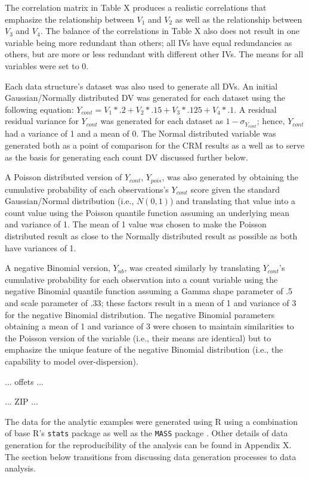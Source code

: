 \documentclass[ShortAfour,times,sageapa]{sagej}
\begin{document}
	\smallskip
	
	The correlation matrix in Table X produces a realistic correlations that emphasize the relationship between $V_1$ and $V_2$ as well as the relationship between $V_3$ and $V_4$.  
	The balance of the correlations in Table X also does not result in one variable being more redundant than others; all IVs have equal redundancies as others, but are more or less redundant with different other IVs.	The means for all variables were set to 0.
	
	Each data structure's dataset was also used to generate all DVs.  An initial Gaussian/Normally distributed DV was generated for each dataset using the following equation: $Y_{cont} = V_1*.2 + V_2*.15 + V_3*.125 + V_4*.1$.  A residual residual variance for $Y_{cont}$ was generated for each dataset as $1 - \sigma_{Y_{cont}}$; hence, $Y_{cont}$ had a variance of 1 and a mean of 0.  
	The Normal distributed variable was generated both as a point of comparison for the CRM results as a well as to serve as the basis for generating each count DV discussed further below.
	
	A Poisson distributed version of $Y_{cont}$, $Y_{pois}$, was also generated by obtaining the cumulative probability of each observations's $Y_{cont}$ score given the standard Gaussian/Normal distribution (i.e., $N(0,1)$) and translating that value into a count value using the Poisson quantile function assuming an underlying mean and variance of 1.  
	The mean of 1 value was chosen to make the Poisson distributed result as close to the Normally distributed result as possible as both have variances of 1.	
	
	A negative Binomial version, $Y_{nb}$, was created similarly by translating $Y_{cont}$'s cumulative probability for each observation into a count variable using the negative Binomial quantile function assuming a Gamma shape parameter of .5 and scale parameter of .33; these factors result in a mean of 1 and variance of 3 for the negative Binomial distribution.  
	The negative Binomial parameters obtaining a mean of 1 and variance of 3 were chosen to maintain similarities to the Poisson version of the variable (i.e., their means are identical) but to emphasize the unique feature of the negative Binomial distribution (i.e., the capability to model over-dispersion).  
	
	... offets ...
	
	... ZIP ...
	
	The data for the analytic examples were generated using R \cite{R} using a combination of base R's \texttt{stats} package as well as the \texttt{MASS} package \cite{MASS}.  
	Other details of data generation for the reproducibility of the analysis can be found in Appendix X.  
	The section below transitions from discussing data generation processes to data analysis.
	
\end{document}
